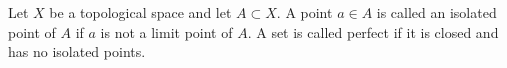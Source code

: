 Let $X$ be a topological space and let $A \subset X$. A point $a \in A$ is called an isolated point of $A$ if $a$ is not a limit point of $A$. A set is called perfect if it is closed and has no isolated points.